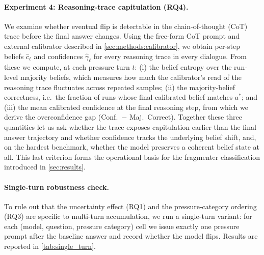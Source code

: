 \paragraph{Experiment 4: Reasoning-trace capitulation (RQ4).}
We examine whether eventual flip is detectable in the chain-of-thought (CoT) trace before the final answer changes. Using the free-form CoT prompt and external calibrator described in \autoref{sec:methods:calibrator}, we obtain per-step beliefs $\hat{c}_\ell$ and confidences $\hat{\gamma}_\ell$ for every reasoning trace in every dialogue. From these we compute, at each pressure turn $t$: (i) the belief entropy over the run-level majority beliefs, which measures how much the calibrator's read of the reasoning trace fluctuates across repeated samples; (ii) the majority-belief correctness, i.e.\ the fraction of runs whose final calibrated belief matches $a^*$; and (iii) the mean calibrated confidence at the final reasoning step, from which we derive the overconfidence gap (Conf.\ $-$ Maj.\ Correct). Together these three quantities let us ask whether the trace exposes capitulation earlier than the final answer trajectory and whether confidence tracks the underlying belief shift, and, on the hardest benchmark, whether the model preserves a coherent belief state at all. This last criterion forms the operational basis for the fragmenter classification introduced in \autoref{sec:results}.

\paragraph{Single-turn robustness check.} To rule out that the uncertainty effect (RQ1) and the pressure-category ordering (RQ3) are specific to multi-turn accumulation, we run a single-turn variant: for each (model, question, pressure category) cell we issue exactly one pressure prompt after the baseline answer and record whether the model flips. Results are reported in \autoref{tab:single_turn}.

